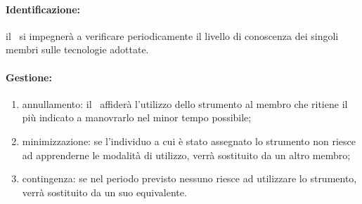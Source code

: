 \documentclass[../PianoProgetto.tex]{subfiles}
\begin{document}
	
	\paragraph*{Identificazione:} il \responsabilediprogetto\ si impegnerà a verificare periodicamente il livello di conoscenza dei singoli membri sulle tecnologie adottate.
	
	\paragraph*{Gestione:}
	\begin{enumerate}
		\item annullamento: il \responsabilediprogetto\ affiderà l'utilizzo dello strumento al membro che ritiene il più indicato a manovrarlo nel minor tempo possibile;
		\item minimizzazione: se l'individuo a cui è stato assegnato lo strumento non riesce ad apprenderne le modalità di utilizzo, verrà sostituito da un altro membro;
		\item contingenza: se nel periodo previsto nessuno riesce ad utilizzare lo strumento, verrà sostituito da un suo equivalente. 
	\end{enumerate}		
	
\end{document}
